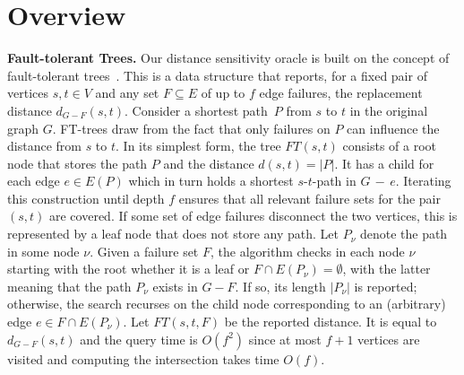\documentclass{theoretics}
\newcommand*{\length}[1]{|#1|}
\begin{document}
\section{Overview}
\label{sec:overview}

\textbf{Fault-tolerant Trees.}
Our distance sensitivity oracle is built on the concept of fault-tolerant trees~\cite{ChCoFiKa17}.
This is a data structure that reports,
for a fixed pair of vertices $s,t \in V$ and any set $F \subseteq E$ of up to $f$ edge failures,
the replacement distance $d_{G-F}(s,t)$.
Consider a shortest path~$P$ from $s$ to $t$ in the original graph $G$.
FT-trees draw from the fact that only failures on $P$ can influence the distance from $s$ to $t$.
In its simplest form, the tree $FT(s,t)$ consists of a root node that stores the path $P$
and the distance $d(s,t) = |P|$.
It has a child for each edge $e \in E(P)$ which in turn holds a shortest $s$-$t$-path in $G\,{-}\,e$.
Iterating this construction until depth $f$ ensures 
that all relevant failure sets for the pair $(s,t)$ are covered.
If some set of edge failures disconnect the two vertices,
this is represented by a leaf node that does not store any path.
Let $P_\nu$ denote the path in some node $\nu$.
Given a failure set $F$, the algorithm checks in each node $\nu$ starting with the root 
whether it is a leaf or $F \cap E(P_\nu) = \emptyset$,
with the latter meaning that the path $P_\nu$ exists in $G-F$.
If so, its length $\length{P_\nu}$ is reported;
otherwise, the search recurses on the child node corresponding to 
an (arbitrary) edge $e \in F \cap E(P_\nu)$.
Let $FT(s,t,F)$ be the reported distance.
It is equal to $d_{G-F}(s,t)$ and the query time is $O(f^2)$ since at most $f{+}1$ vertices are visited and
computing the intersection takes time $O(f)$.
\end{document}
